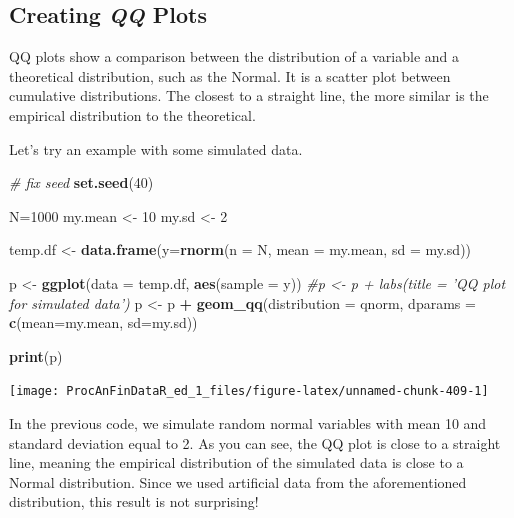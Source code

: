 \documentclass[11pt,]{book}
\newenvironment{Shaded}{\begin{snugshade}}{\end{snugshade}}
\newcommand{\KeywordTok}[1]{\textcolor[rgb]{0.27,0.27,0.27}{\textbf{#1}}}
\newcommand{\DataTypeTok}[1]{\textcolor[rgb]{0.27,0.27,0.27}{#1}}
\newcommand{\DecValTok}[1]{\textcolor[rgb]{0.06,0.06,0.06}{#1}}
\newcommand{\StringTok}[1]{\textcolor[rgb]{0.5,0.5,0.5}{#1}}
\newcommand{\CommentTok}[1]{\textcolor[rgb]{0.56,0.35,0.01}{\textit{#1}}}
\newcommand{\OperatorTok}[1]{\textcolor[rgb]{0.81,0.36,0.00}{\textbf{#1}}}
\newcommand{\NormalTok}[1]{#1}
\begin{document}
\subsection{\texorpdfstring{Creating \emph{QQ}
Plots}{Creating QQ Plots}}\label{creating-qq-plots}

QQ plots show a comparison between the distribution of a variable and a
theoretical distribution, such as the Normal. It is a scatter plot
between cumulative distributions. The closest to a straight line, the
more similar is the empirical distribution to the theoretical.

Let's try an example with some simulated data.

\begin{Shaded}
\begin{Highlighting}[]
\CommentTok{# fix seed}
\KeywordTok{set.seed}\NormalTok{(}\DecValTok{40}\NormalTok{)}

\NormalTok{N=}\DecValTok{1000}
\NormalTok{my.mean <-}\StringTok{ }\DecValTok{10}
\NormalTok{my.sd <-}\StringTok{ }\DecValTok{2}

\NormalTok{temp.df <-}\StringTok{ }\KeywordTok{data.frame}\NormalTok{(}\DataTypeTok{y=}\KeywordTok{rnorm}\NormalTok{(}\DataTypeTok{n =}\NormalTok{ N, }\DataTypeTok{mean =}\NormalTok{ my.mean, }\DataTypeTok{sd =}\NormalTok{ my.sd))}

\NormalTok{p <-}\StringTok{ }\KeywordTok{ggplot}\NormalTok{(}\DataTypeTok{data =}\NormalTok{ temp.df, }\KeywordTok{aes}\NormalTok{(}\DataTypeTok{sample =}\NormalTok{ y)) }
\CommentTok{#p <- p + labs(title = 'QQ plot for simulated data')}
\NormalTok{p <-}\StringTok{ }\NormalTok{p }\OperatorTok{+}\StringTok{ }\KeywordTok{geom_qq}\NormalTok{(}\DataTypeTok{distribution =}\NormalTok{ qnorm, }
                 \DataTypeTok{dparams =} \KeywordTok{c}\NormalTok{(}\DataTypeTok{mean=}\NormalTok{my.mean, }\DataTypeTok{sd=}\NormalTok{my.sd))}
  
\KeywordTok{print}\NormalTok{(p)}
\end{Highlighting}
\end{Shaded}

\begin{center}\texttt{[image: ProcAnFinDataR\_ed\_1\_files/figure-latex/unnamed-chunk-409-1]} \end{center}

In the previous code, we simulate random normal variables with mean 10
and standard deviation equal to 2. As you can see, the QQ plot is close
to a straight line, meaning the empirical distribution of the simulated
data is close to a Normal distribution. Since we used artificial data
from the aforementioned distribution, this result is not surprising!
\end{document}
